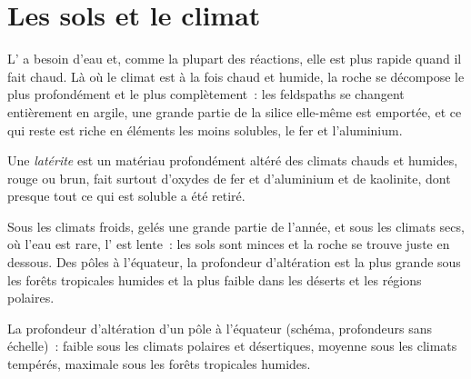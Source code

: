 \section{Les sols et le climat}

L' a besoin d'eau et, comme la plupart des réactions,
elle est plus rapide quand il fait chaud. Là où le climat est à la fois
chaud et humide, la roche se décompose le plus profondément et le plus
complètement~: les feldspaths se changent entièrement en argile, une grande
partie de la silice elle-même est emportée, et ce qui reste est riche en
éléments les moins solubles, le fer et l'aluminium.

\begin{definition}[Latérite]\label{def:g10:soil-formation:laterite}
Une \emph{latérite} est un matériau profondément
altéré des climats chauds et humides, rouge ou brun, fait surtout d'oxydes
de fer et d'aluminium et de kaolinite, dont presque tout ce qui est soluble
a été retiré.
\end{definition}

Sous les climats froids, gelés une grande partie de l'année, et sous les
climats secs, où l'eau est rare, l' est lente~: les sols
sont minces et la roche se trouve juste en dessous. Des pôles à l'équateur,
la profondeur d'altération est la plus grande sous les forêts tropicales
humides et la plus faible dans les déserts et les régions polaires.

\begin{omfigure}

{\small La profondeur d'altération d'un pôle à l'équateur (schéma,
profondeurs sans échelle)~: faible sous les climats polaires et
désertiques, moyenne sous les climats tempérés, maximale sous les forêts
tropicales humides.}
\end{omfigure}

